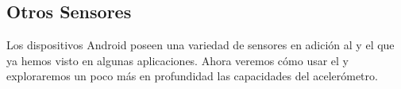 










\subsection*{Otros Sensores}

Los dispositivos Android poseen una variedad de sensores en adición al
 y el  que ya
hemos visto en algunas aplicaciones. Ahora veremos cómo usar el
 y exploraremos un poco más en
profundidad las capacidades del acelerómetro.


